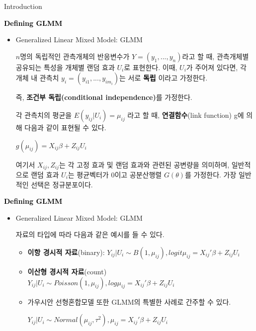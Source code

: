 \documentclass[9pt, xelatex]{beamer}
\begin{document}
{\begin{frame}[allowframebreaks]{Introduction}
\begin{itemize}
		\end{itemize}
		\framebreak
		
		
		\textcolor{black}{\textbf{Defining GLMM}}
		\vspace{2mm}
		\begin{itemize}
			\item Generalized Linear Mixed Model: GLMM
			\vspace{3mm}
			
			$n$명의 독립적인 관측개체의 반응변수가 $ Y=(y_{1},...,y_{n}) $라고 할 때, 관측개체별 공유되는 특성을 개체별 랜덤 효과 $U_{i}$로 표현한다. 이때, $U_{i}$가 주어져 있다면, 각 개체 내 관측치 $y_{i}=(y_{i1},...,y_{im_{i}})$는 서로 \textcolor{black}{\textbf{독립}} 이라고 가정한다. 
			
			즉, \textbf{조건부 독립(conditional independence)}를 가정한다.
			\vspace{2mm}
			
			각 관측치의 평균을 $ E(y_{ij}|U_{i})=\mu_{ij}$ 라고 할 때, \textbf{연결함수}(link function) g에 의해 다음과 같이 표현될 수 있다.
			
			\begin{center} $g(\mu_{ij})=X_{ij}\beta+Z_{ij}U_{i}$\end{center}
			\vspace{2mm}
			
			여기서 $X_{ij}, Z_{ij}$는 각 고정 효과 및 랜덤 효과와 관련된 공변량을 의미하며, 일반적으로 랜덤 효과 $U_{i}$는 평균벡터가 0이고 공분산행렬 $G(\theta)$를 가정한다. 가장 일반적인 선택은 정규분포이다. 
			\vspace{2mm}		
			
		\end{itemize}	
		\framebreak
		
		
		\textcolor{black}{\textbf{Defining GLMM}}
		\vspace{2mm}
		\begin{itemize}
			\item Generalized Linear Mixed Model: GLMM
			\vspace{3mm}
			
			자료의 타입에 따라 다음과 같은 예시를 들 수 있다.
			
			\begin{itemize}
				\item \textbf{이항 경시적 자료}(binary): $Y_{ij}|U_{i} \sim B(1,\mu_{ij}), logit\mu_{ij}=X_{ij}'\beta+Z_{ij}U_{i}$
				\item \textbf{이산형 경시적 자료}(count) $Y_{ij}|U_{i} \sim Poisson(1,\mu_{ij}), log\mu_{ij}=X_{ij}'\beta+Z_{ij}U_{i}$
				\item 가우시안 선형혼합모델 또한 GLMM의 특별한 사례로 간주할 수 있다.
				\begin{center} $Y_{ij}|U_{i} \sim Normal(\mu_{ij},\tau^{2}), \mu_{ij}=X_{ij}'\beta+Z_{ij}U_{i}$
				\end{center}
			\end{itemize}
			\vspace{2mm}
			

\end{itemize}
\end{frame}}
\end{document}
